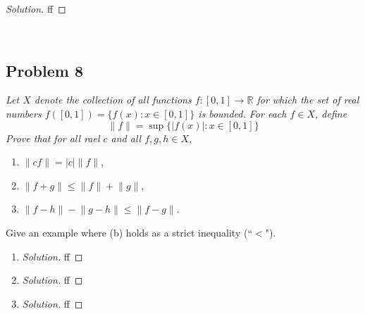 \documentclass{article}
\newcommand{\R}{{\mathbb R}}
\begin{document}
\begin{proof}[Solution]\let\qed\relax
	ff
\end{proof}
\clearpage
~\clearpage

\subsection*{Problem 8}
{\it Let $X$ denote the collection of all functions $f \colon [0,1] \to \R$
for which the set of real numbers $f([0,1]) = \{f(x) \colon x \in [0,1]\}$ is bounded.
For each $f \in X$, define
\[
	\lVert f \rVert = \sup\{|f(x)| \colon x \in [0,1]\}
\]
Prove that for all rael $c$ and all $f,g,h \in X$,
\begin{enumerate}
	\item $\lVert cf \rVert = |c|\lVert f \rVert$,
	\item $\lVert f + g \rVert \leq \lVert f \rVert + \lVert g \rVert$,
	\item $\lVert f - h \rVert - \lVert g - h\rVert \leq \lVert f - g\rVert$.
\end{enumerate}
Give an example where (b) holds as a strict inequality (``$<$").}

\begin{enumerate}
	\item \begin{proof}[Solution]\let\qed\relax
		ff
	\end{proof}
	\item \begin{proof}[Solution]\let\qed\relax
		ff
	\end{proof}
	\item \begin{proof}[Solution]\let\qed\relax
		ff
	\end{proof} 
\end{enumerate}
\end{document}
